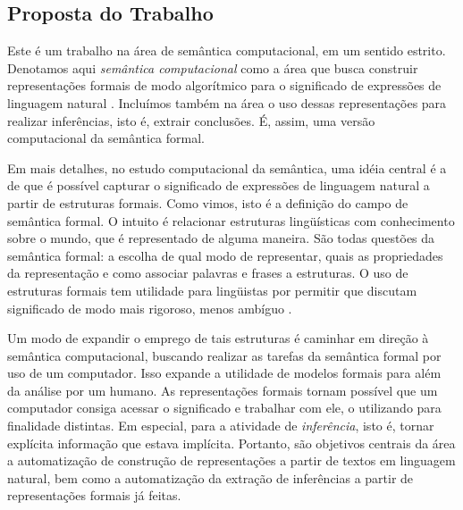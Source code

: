 \subsection{Proposta do Trabalho}

	Este é um trabalho na área de semântica computacional, em um sentido estrito. Denotamos aqui \textit{semântica computacional} como a área que busca construir representações formais de modo algorítmico para o significado de expressões de linguagem natural \citep[p.~ix]{vanEijick:intro}. Incluímos também na área o uso dessas representações para realizar inferências, isto é, extrair conclusões. É, assim, uma versão computacional da semântica formal.

	Em mais detalhes, no estudo computacional da semântica, uma idéia central é a de que é possível capturar o significado de expressões de linguagem natural a partir de estruturas formais. Como vimos, isto é a definição do campo de semântica formal. O intuito é relacionar estruturas lingüísticas com conhecimento sobre o mundo, que é representado de alguma maneira. São todas questões da semântica formal: a escolha de qual modo de representar, quais as propriedades da representação e como associar palavras e frases a estruturas. O uso de estruturas formais tem utilidade para lingüistas por permitir que discutam significado de modo mais rigoroso, menos ambíguo \citep[p. xii]{BlackburnBos:2005}.
	
	
	Um modo de expandir o emprego de tais estruturas é caminhar em direção à semântica computacional, buscando realizar as tarefas da semântica formal por uso de um computador. Isso expande a utilidade de modelos formais para além da análise por um humano. As representações formais tornam possível que um computador consiga acessar o significado e trabalhar com ele, o utilizando para finalidade distintas. Em especial, para a atividade de \textit{inferência}, isto é, tornar explícita informação que estava implícita. Portanto, são objetivos centrais da área a automatização de construção de representações a partir de textos em linguagem natural, bem como a automatização da extração de inferências a partir de representações formais já feitas.

